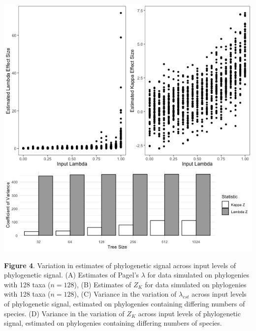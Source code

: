 \documentclass[
]{article}
\begin{document}
\newpage

\includegraphics[width=0.95\linewidth]{Fig4}

\singlespacing \textbf{Figure 4}. Variation in estimates of phylogenetic
signal across input levels of phylogenetic signal. (A) Estimates of
Pagel's \(\lambda\) for data simulated on phylogenies with 128 taxa
(\(n=128\)), (B) Estimates of \(Z_K\) for data simulated on phylogenies
with 128 taxa (\(n=128\)), (C) Variance in the variation of
\(\lambda_{est}\) across input levels of phylogenetic signal, estimated
on phylogenies containing differing numbers of species. (D) Variance in
the variation of \(Z_K\) across input levels of phylogenetic signal,
estimated on phylogenies containing differing numbers of species.
\end{document}
